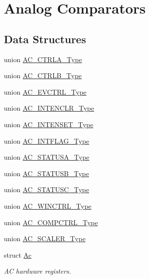 \hypertarget{group___s_a_m_d21___a_c}{}\section{Analog Comparators}
\label{group___s_a_m_d21___a_c}
\subsection*{Data Structures}
\begin{DoxyCompactItemize}
\item 
union \mbox{\hyperlink{union_a_c___c_t_r_l_a___type}{A\+C\+\_\+\+C\+T\+R\+L\+A\+\_\+\+Type}}
\item 
union \mbox{\hyperlink{union_a_c___c_t_r_l_b___type}{A\+C\+\_\+\+C\+T\+R\+L\+B\+\_\+\+Type}}
\item 
union \mbox{\hyperlink{union_a_c___e_v_c_t_r_l___type}{A\+C\+\_\+\+E\+V\+C\+T\+R\+L\+\_\+\+Type}}
\item 
union \mbox{\hyperlink{union_a_c___i_n_t_e_n_c_l_r___type}{A\+C\+\_\+\+I\+N\+T\+E\+N\+C\+L\+R\+\_\+\+Type}}
\item 
union \mbox{\hyperlink{union_a_c___i_n_t_e_n_s_e_t___type}{A\+C\+\_\+\+I\+N\+T\+E\+N\+S\+E\+T\+\_\+\+Type}}
\item 
union \mbox{\hyperlink{union_a_c___i_n_t_f_l_a_g___type}{A\+C\+\_\+\+I\+N\+T\+F\+L\+A\+G\+\_\+\+Type}}
\item 
union \mbox{\hyperlink{union_a_c___s_t_a_t_u_s_a___type}{A\+C\+\_\+\+S\+T\+A\+T\+U\+S\+A\+\_\+\+Type}}
\item 
union \mbox{\hyperlink{union_a_c___s_t_a_t_u_s_b___type}{A\+C\+\_\+\+S\+T\+A\+T\+U\+S\+B\+\_\+\+Type}}
\item 
union \mbox{\hyperlink{union_a_c___s_t_a_t_u_s_c___type}{A\+C\+\_\+\+S\+T\+A\+T\+U\+S\+C\+\_\+\+Type}}
\item 
union \mbox{\hyperlink{union_a_c___w_i_n_c_t_r_l___type}{A\+C\+\_\+\+W\+I\+N\+C\+T\+R\+L\+\_\+\+Type}}
\item 
union \mbox{\hyperlink{union_a_c___c_o_m_p_c_t_r_l___type}{A\+C\+\_\+\+C\+O\+M\+P\+C\+T\+R\+L\+\_\+\+Type}}
\item 
union \mbox{\hyperlink{union_a_c___s_c_a_l_e_r___type}{A\+C\+\_\+\+S\+C\+A\+L\+E\+R\+\_\+\+Type}}
\item 
struct \mbox{\hyperlink{struct_ac}{Ac}}
\begin{DoxyCompactList}\small\item\em AC hardware registers. \end{DoxyCompactList}\end{DoxyCompactItemize}

